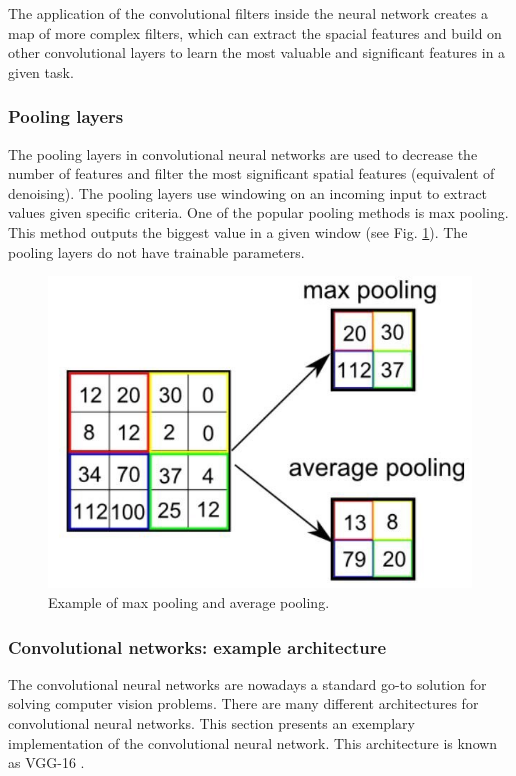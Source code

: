 The application of the convolutional filters inside the neural network creates a map of more complex filters, which can extract the spacial features and build on other convolutional layers to learn the most valuable and significant features in a given task.

\subsubsection{Pooling layers}

The pooling layers in convolutional neural networks are used to decrease the number of features and filter the most significant spatial features (equivalent of denoising). The pooling layers use windowing on an incoming input to extract values given specific criteria.
One of the popular pooling methods is max pooling.
This method outputs the biggest value in a given window (see Fig. \ref{fig:pooling_layer}).
The pooling layers do not have trainable parameters.

\begin{figure}
  \centering
  \includegraphics[width=0.5\linewidth]{figures/chapter3/avg_max_pooling.png}
  \caption{Example of max pooling and average pooling\protect\footnotemark. }
  \label{fig:pooling_layer}
\end{figure}
\subsubsection{Convolutional networks: example architecture}

The convolutional neural networks are nowadays a standard go-to solution for solving computer vision problems.
There are many different architectures for convolutional neural networks.
This section presents an exemplary implementation of the convolutional neural network.
This architecture is known as VGG-16 \cite{https://doi.org/10.48550/arxiv.1409.1556}.

